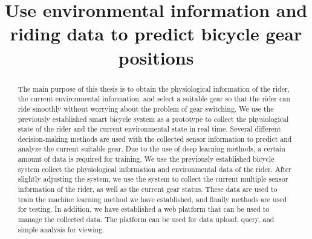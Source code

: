 \documentclass[conference]{IEEEtran}
\begin{document}
\title{Use environmental information and riding data to predict bicycle gear positions\\}

\author{
\and
{}
}

\maketitle

\begin{abstract}

The main purpose of this thesis is to obtain the physiological information of the rider, the current environmental information, and select a suitable gear so that the rider can ride smoothly without worrying about the problem of gear switching. We use the previously established smart bicycle system as a prototype to collect the physiological state of the rider and the current environmental state in real time. 
Several different decision-making methods are used with the collected sensor information to predict and analyze the current suitable gear. Due to the use of deep learning methods, a certain amount of data is required for training. We use the previously established bicycle system collect the physiological information and environmental data of the rider. After slightly adjusting the system, we use the system to collect the current multiple sensor information of the rider, as well as the current gear status. 
These data are used to train the machine learning method we have established, and finally methods are used for testing. In addition, we have established a web platform that can be used to manage the collected data. The platform can be used for data upload, query, and simple analysis for viewing.
\end{abstract}
\end{document}
